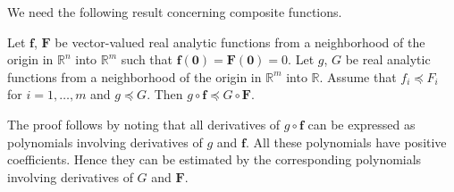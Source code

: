 We need the following result concerning composite functions.

\begin{Theorem}
\label{thm:majorization-under-composition}
Let $\bm{f}$, $\bm{F}$ be vector-valued real analytic functions from a neighborhood of the origin in $\mathbb{R}^n$ into $\mathbb{R}^m$ such that $\bm{f}(\bm{0})=\bm{F}(\bm{0})=0$. Let $g$, $G$ be real analytic functions from a neighborhood of the origin in $\mathbb{R}^m$ into $\mathbb{R}$. Assume that $f_i\preceq F_i$ for $i=1,\ldots,m$ and $g\preceq G$. Then $g\circ\bm{f}\preceq G\circ\bm{F}$.
\end{Theorem}

The proof follows by noting that all derivatives of $g\circ\bm{f}$ can be expressed as polynomials involving derivatives of $g$ and $\bm{f}$. All these polynomials have positive coefficients. Hence they can be estimated by the corresponding polynomials involving derivatives of $G$ and $\bm{F}$.
